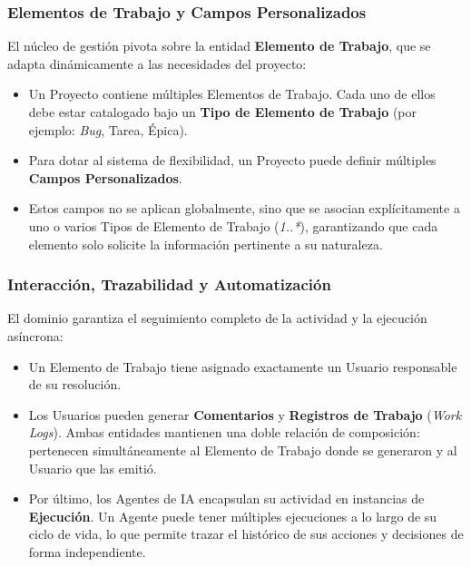 \subsubsection{Elementos de Trabajo y Campos Personalizados}
El núcleo de gestión pivota sobre la entidad \textbf{Elemento de Trabajo}, que se adapta dinámicamente a las necesidades del proyecto:
\begin{itemize}
    \item Un Proyecto contiene múltiples Elementos de Trabajo. Cada uno de ellos debe estar catalogado bajo un \textbf{Tipo de Elemento de Trabajo} (por ejemplo: \emph{Bug}, Tarea, Épica).
    \item Para dotar al sistema de flexibilidad, un Proyecto puede definir múltiples \textbf{Campos Personalizados}.
    \item Estos campos no se aplican globalmente, sino que se asocian explícitamente a uno o varios Tipos de Elemento de Trabajo (\emph{1..*}), garantizando que cada elemento solo solicite la información pertinente a su naturaleza.
\end{itemize}

\subsubsection{Interacción, Trazabilidad y Automatización}
El dominio garantiza el seguimiento completo de la actividad y la ejecución asíncrona:
\begin{itemize}
    \item Un Elemento de Trabajo tiene asignado exactamente un Usuario responsable de su resolución.
    \item Los Usuarios pueden generar \textbf{Comentarios} y \textbf{Registros de Trabajo} (\emph{Work Logs}). Ambas entidades mantienen una doble relación de composición: pertenecen simultáneamente al Elemento de Trabajo donde se generaron y al Usuario que las emitió.
    \item Por último, los Agentes de IA encapsulan su actividad en instancias de \textbf{Ejecución}. Un Agente puede tener múltiples ejecuciones a lo largo de su ciclo de vida, lo que permite trazar el histórico de sus acciones y decisiones de forma independiente.
\end{itemize}